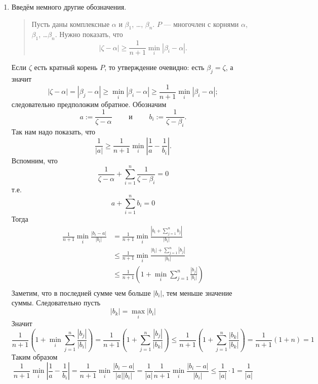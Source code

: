 \documentclass[12pt,a4paper]{article}
\begin{document}
\begin{enumproblem}
\begin{enumerate}
            \item Введём немного другие обозначения.
                \begin{quotation}
                    Пусть даны комплексные $\alpha$ и $\beta_1$, \dots, $\beta_n$. $P$ --- многочлен с корнями $\alpha$, $\beta_1$, \dots $\beta_n$. Нужно показать, что
                    \[|\zeta - \alpha| \geqslant \frac{1}{n+1} \min_i |\beta_i - \alpha|.\]
                \end{quotation}
                Если $\zeta$ есть кратный корень $P$, то утверждение очевидно: есть $\beta_j = \zeta$, а значит
                \[|\zeta - \alpha| = |\beta_j - \alpha| \geqslant \min_i |\beta_i - \alpha| \geqslant \frac{1}{n+1} \min_i |\beta_i - \alpha|;\]
                следовательно предположим обратное. Обозначим
                \[
                    a := \frac{1}{\zeta - \alpha}
                    \qquad \text{ и } \qquad
                    b_i := \frac{1}{\zeta - \beta_i}.
                \]
                Так нам надо показать, что
                \[\frac{1}{|a|} \geqslant \frac{1}{n+1} \min_i \left|\frac{1}{a} - \frac{1}{b_i}\right|.\]
                Вспомним, что
                \[\frac{1}{\zeta - \alpha} + \sum_{i=1}^n \frac{1}{\zeta - \beta_i} = 0\]
                т.е.
                \[a + \sum_{i=1}^n b_i = 0\]
                Тогда
                \begin{align*}
                    \frac{1}{n+1} \min_i \frac{|b_i - a|}{|b_i|}
                    &= \frac{1}{n+1} \min_i \frac{|b_i + \sum_{j=1}^n b_j|}{|b_i|}\\
                    &\leqslant \frac{1}{n+1} \min_i \frac{|b_i| + \sum_{j=1}^n |b_j|}{|b_i|}\\
                    &\leqslant \frac{1}{n+1} \left(1 + \min_i \sum_{j=1}^n \frac{|b_j|}{|b_i|}\right)\\
                \end{align*}
                Заметим, что в последней сумме чем больше $|b_i|$, тем меньше значение суммы. Следовательно пусть
                \[|b_k| = \max_i |b_i|\]
                Значит
                \[
                    \frac{1}{n+1} \left(1 + \min_i \sum_{j=1}^n \frac{|b_j|}{|b_i|}\right)
                    = \frac{1}{n+1} \left(1 + \sum_{j=1}^n \frac{|b_j|}{|b_k|}\right)
                    \leqslant \frac{1}{n+1} \left(1 + \sum_{j=1}^n \frac{|b_k|}{|b_k|}\right)
                    = \frac{1}{n+1} (1 + n)
                    = 1
                \]
                Таким образом
                \[
                    \frac{1}{n+1} \min_i \left|\frac{1}{a} - \frac{1}{b_i}\right|
                    = \frac{1}{n+1} \min_i \frac{|b_i - a|}{|a| |b_i|}
                    = \frac{1}{|a|} \frac{1}{n+1} \min_i \frac{|b_i - a|}{|b_i|}
                    \leqslant \frac{1}{|a|} \cdot 1
                    = \frac{1}{|a|}
                \]
        \end{enumerate}
    \end{enumproblem}
\end{document}
